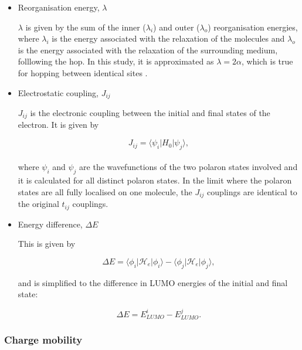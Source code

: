 \documentclass[a4paper,12pt]{article}
\begin{document}
\begin{itemize}
\item Reorganisation energy, $\lambda$

\noindent $\lambda$ is given by the sum of the inner ($\lambda_i$) and outer ($\lambda_o$) reorganisation energies, where $\lambda_i$ is the  energy associated with the relaxation of the molecules and $\lambda_o$ is the energy associated with the relaxation of the surrounding medium, folllowing the hop. In this study, it is approximated as $\lambda=2\alpha$, which is true for hopping between identical sites \cite{Duhm2012}. 
 
 \item Electrostatic coupling, $J_{ij}$
 
 \noindent $J_{ij}$ is the electronic coupling between the initial and final states of the electron. It is given by 
 
 \begin{equation*}
 J_{ij} = \langle \psi_i | H_0 | \psi_j \rangle,
 \end{equation*}\\
 
 \noindent where $\psi_i$ and $\psi_j$ are the wavefunctions of the two polaron states involved and it is calculated for all distinct polaron states. In the limit where the polaron states are all fully localised on one molecule, the $J_{ij}$ couplings are identical to the original $t_{ij}$ couplings.\\

 \item Energy difference, $\Delta E$ 

This is given by 

 \begin{equation*}
 \Delta E = \langle \phi_i | \mathcal{H}_e | \phi_i \rangle - \langle \phi_j | \mathcal{H}_e | \phi_j \rangle,
 \end{equation*}

and is simplified to the difference in LUMO energies of the initial and final state:

 \begin{equation}
 \Delta E = E_{LUMO}^i - E_{LUMO}^j.
 \end{equation} 
\end{itemize}

\subsubsection{Charge mobility}
\end{document}
